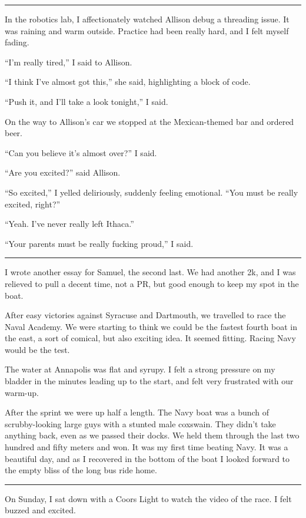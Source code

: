 \plainfancybreak{12pt}{2}{* * *}

In the robotics lab, I affectionately watched Allison debug a threading issue.
It was raining and warm outside.  Practice had been really hard, and I felt
myself fading.

``I'm really tired,'' I said to Allison.

``I think I've almost got this,'' she said, highlighting a block of code.

``Push it, and I'll take a look tonight,'' I said.

On the way to Allison's car we stopped at the Mexican-themed bar and ordered
beer.

``Can you believe it's almost over?'' I said.

``Are you excited?'' said Allison.

``So excited,'' I yelled deliriously, suddenly feeling emotional.  ``You must be
really excited, right?''

``Yeah.  I've never really left Ithaca.''

``Your parents must be really fucking proud,'' I said.

\plainfancybreak{12pt}{2}{* * *}

I wrote another essay for Samuel, the second last.  We had another 2k, and I was
relieved to pull a decent time, not a PR, but good enough to keep my spot in the
boat.

After easy victories against Syracuse and Dartmouth, we travelled to race the
Naval Academy.  We were starting to think we could be the fastest fourth boat in
the east, a sort of comical, but also exciting idea.  It seemed fitting.  Racing
Navy would be the test.

The water at Annapolis was flat and syrupy.  I felt a strong pressure on my
bladder in the minutes leading up to the start, and felt very frustrated with
our warm-up.   

After the sprint we were up half a length.  The Navy boat was a bunch of
scrubby-looking large guys with a stunted male coxswain.  They didn't take
anything back, even as we passed their docks.  We held them through the last two
hundred and fifty meters and won.  It was my first time beating Navy.  It was a
beautiful day, and as I recovered in the bottom of the boat I looked forward to
the empty bliss of the long bus ride home.

\plainfancybreak{12pt}{2}{* * *}

On Sunday, I sat down with a Coors Light to watch the video of the race.  I felt
buzzed and excited. 


